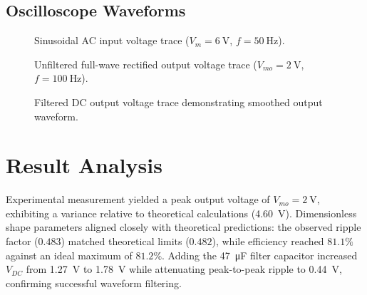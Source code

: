 \subsection{Oscilloscope Waveforms}

\begin{figure}[h!]
	\centering
	\caption{Sinusoidal AC input voltage trace ($V_m=\qty{6}{\volt}$, $f=\qty{50}{\hertz}$).}
	\label{fig:waveinput6}
\end{figure}

\begin{figure}[h!]
	\centering
	\caption{Unfiltered full-wave rectified output voltage trace ($V_{mo}=\qty{2}{\volt}$, $f=\qty{100}{\hertz}$).}
	\label{fig:waveoutput6}
\end{figure}

\begin{figure}[h!]
	\centering
	\caption{Filtered DC output voltage trace demonstrating smoothed output waveform.}
	\label{fig:wavefiltered6}
\end{figure}

\section{Result Analysis}
\label{sec:resultanalysis6}
Experimental measurement yielded a peak output voltage of $V_{mo}=\qty{2}{\volt}$, exhibiting a variance relative to theoretical calculations (\qty{4.60}{\volt}). Dimensionless shape parameters aligned closely with theoretical predictions: the observed ripple factor ($0.483$) matched theoretical limits ($0.482$), while efficiency reached $81.1\%$ against an ideal maximum of $81.2\%$. Adding the \qty{47}{\micro\farad} filter capacitor increased $V_{DC}$ from \qty{1.27}{\volt} to \qty{1.78}{\volt} while attenuating peak-to-peak ripple to \qty{0.44}{\volt}, confirming successful waveform filtering.

